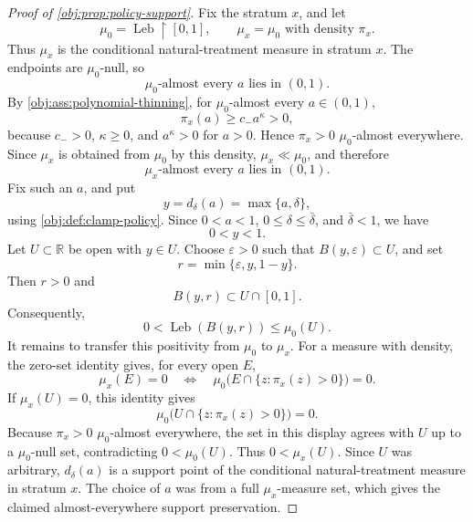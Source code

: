 \begin{proof}[Proof of \cref{obj:prop:policy-support}]
Fix the stratum \(x\), and let
\[
\mu_0=\operatorname{Leb}\!\restriction[0,1],
\qquad
\mu_x=\mu_0\text{ with density }\pi_x .
\]
Thus \(\mu_x\) is the conditional natural-treatment measure in stratum \(x\).  The endpoints are \(\mu_0\)-null, so
\[
\mu_0\text{-almost every }a\text{ lies in }(0,1).
\]%
By \cref{obj:ass:polynomial-thinning}, for \(\mu_0\)-almost every \(a\in(0,1)\),
\[
\pi_x(a)\ge c_- a^\kappa>0,
\]%
because \(c_->0\), \(\kappa\ge0\), and \(a^\kappa>0\) for \(a>0\).  Hence \(\pi_x>0\) \(\mu_0\)-almost everywhere.  Since \(\mu_x\) is obtained from \(\mu_0\) by this density, \(\mu_x\ll\mu_0\), and therefore
\[
\mu_x\text{-almost every }a\text{ lies in }(0,1).
\]%
Fix such an \(a\), and put
\[
y=d_\delta(a)=\max\{a,\delta\},
\]
using \cref{obj:def:clamp-policy}.  Since \(0<a<1\), \(0\leq\delta\leq\bar\delta\), and \(\bar\delta<1\), we have
\[
0<y<1.
\]%
Let \(U\subset\mathbb R\) be open with \(y\in U\).  Choose \(\varepsilon>0\) such that \(B(y,\varepsilon)\subset U\), and set
\[
r=\min\{\varepsilon,y,1-y\}.
\]
Then \(r>0\) and
\[
B(y,r)\subset U\cap[0,1].
\]%
Consequently,
\[
0<\operatorname{Leb}(B(y,r))\leq \mu_0(U).
\]%
It remains to transfer this positivity from \(\mu_0\) to \(\mu_x\).  For a measure with density, the zero-set identity gives, for every open \(E\),
\[
\mu_x(E)=0
\quad\Longleftrightarrow\quad
\mu_0\bigl(E\cap\{z:\pi_x(z)>0\}\bigr)=0 .
\]%
If \(\mu_x(U)=0\), this identity gives
\[
\mu_0\bigl(U\cap\{z:\pi_x(z)>0\}\bigr)=0.
\]
Because \(\pi_x>0\) \(\mu_0\)-almost everywhere, the set in this display agrees with \(U\) up to a \(\mu_0\)-null set, contradicting \(0<\mu_0(U)\).  Thus \(0<\mu_x(U)\).  Since \(U\) was arbitrary, \(d_\delta(a)\) is a support point of the conditional natural-treatment measure in stratum \(x\).  The choice of \(a\) was from a full \(\mu_x\)-measure set, which gives the claimed almost-everywhere support preservation.
\end{proof}
